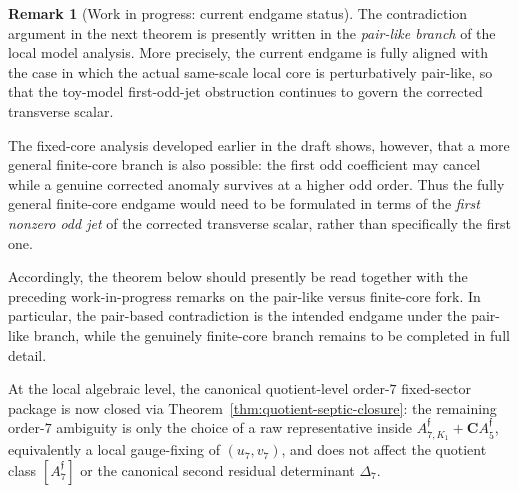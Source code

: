 \documentclass[11pt,a4paper]{amsart}
\theoremstyle{plain}
\theoremstyle{definition}
\newtheorem{remark}[theorem]{Remark}
\begin{document}
\begin{remark}[Work in progress: current endgame status]
\label{rem:wip-final-endgame-status}
The contradiction argument in the next theorem is presently written in the
\emph{pair-like branch} of the local model analysis. More precisely, the
current endgame is fully aligned with the case in which the actual same-scale
local core is perturbatively pair-like, so that the toy-model first-odd-jet
obstruction continues to govern the corrected transverse scalar.

The fixed-core analysis developed earlier in the draft shows, however, that
a more general finite-core branch is also possible: the first odd
coefficient may cancel while a genuine corrected anomaly survives at a
higher odd order. Thus the fully general finite-core endgame would need to
be formulated in terms of the \emph{first nonzero odd jet} of the corrected
transverse scalar, rather than specifically the first one.

Accordingly, the theorem below should presently be read together with the
preceding work-in-progress remarks on the pair-like versus finite-core fork.
In particular, the pair-based contradiction is the intended endgame under
the pair-like branch, while the genuinely finite-core branch remains to be
completed in full detail.

At the local algebraic level, the canonical quotient-level order-$7$
fixed-sector package is now closed via
Theorem~\ref{thm:quotient-septic-closure}: the remaining order-$7$ ambiguity is
only the choice of a raw representative inside
$A_{7,K_1}^{\mathfrak f}+\mathbf C A_5^{\mathfrak f}$, equivalently a local
gauge-fixing of $(u_7,v_7)$, and does not affect the quotient class
$[A_7^{\mathfrak f}]$ or the canonical second residual determinant
$\Delta_7$.
\end{remark}
\end{document}
